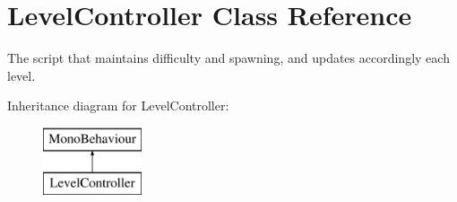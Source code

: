 \hypertarget{class_level_controller}{}\section{Level\+Controller Class Reference}
\label{class_level_controller}


The script that maintains difficulty and spawning, and updates accordingly each level.  


Inheritance diagram for Level\+Controller\+:\begin{figure}[H]
\begin{center}
\leavevmode
\includegraphics[height=2.000000cm]{class_level_controller}
\end{center}
\end{figure}

